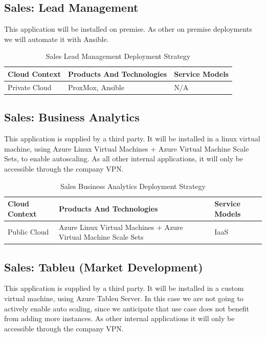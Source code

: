 \documentclass{llncs}
\begin{document}
\subsection{Sales: Lead Management}
This application will be installed on premise. As other on premise deployments we will automate it with Ansible.
\begin{table}[h!]
    \centering
    \begin{tabular}{lll}
        \hline
        \textbf{Cloud Context} & \textbf{Products And Technologies} & \textbf{Service Models} \\
        \hline
        Private Cloud          & ProxMox, Ansible                   & N/A                     \\
        \hline
    \end{tabular}
    \caption{Sales Lead Management Deployment Strategy}
\end{table}

\subsection{Sales: Business Analytics}
This application is supplied by a third party. It will be installed in a linux virtual machine, using Azure Linux Virtual Machines + Azure Virtual Machine Scale Sets, to enable autoscaling.
As all other internal applications, it will only be accessible through the company VPN.\\

\begin{table}[h!]
    \centering
    \begin{tabular}{lll}
        \hline
        \textbf{Cloud Context} & \textbf{Products And Technologies}                              & \textbf{Service Models} \\
        \hline
        Public Cloud           & Azure Linux Virtual Machines + Azure Virtual Machine Scale Sets & IaaS                    \\
    \end{tabular}
    \caption{Sales Business Analytics Deployment Strategy}
\end{table}

\subsection{Sales: Tableu (Market Development)}
This application is supplied by a third party. It will be installed in a custom virtual machine, using Azure Tableu Server.
In this case we are not going to actively enable auto scaling, since we anticipate that use case does not benefit from adding more instances.
As other internal applications it will only be accessible through the company VPN.\\
\end{document}
